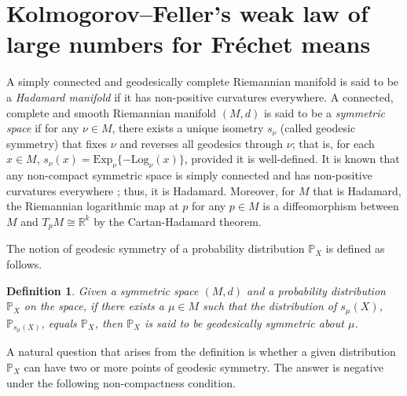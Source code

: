 \documentclass[preprint]{imsart}
\theoremstyle{plain}
\newtheorem{definition}{Definition}
\theoremstyle{remark}
\begin{document}
\section{Kolmogorov--Feller's weak law of large numbers for Fréchet means}

A simply connected and geodesically complete Riemannian manifold is said to be a {\it Hadamard manifold} if it has non-positive curvatures everywhere. A connected, complete and smooth Riemannian manifold $(M,d)$ is said to be a {\it symmetric space} if for any $\nu \in M$, there exists a unique isometry $s_\nu$ (called geodesic symmetry) that fixes $\nu$ and reverses all geodesics through $\nu$; that is, for each $x \in M$, $s_{\nu}(x)=\mbox{Exp}_{\nu}\{-\mbox{Log}_{\nu}(x)\}$, provided it is well-defined. It is known that any non-compact symmetric space is simply connected and has non-positive curvatures everywhere \citep[][]{helgason1979differential}; thus, it is Hadamard. 
% 
Moreover, for $M$ that is Hadamard, the Riemannian logarithmic map at $p$ for any $p \in M$ is a diffeomorphism between $M$ and $T_{p}M \cong \mathbb{R}^{k}$ by the Cartan-Hadamard theorem. 
 


 
The notion of geodesic symmetry of a probability distribution $\mathbb{P}_{X}$ is defined as follows.
\begin{definition}
Given a symmetric space $(M,d)$ and a probability distribution $\mathbb{P}_{X}$ on the space, if there exists a $\mu \in M$ such that the distribution of $s_\mu(X)$, $\mathbb{P}_{s_\mu (X)}$, equals $\mathbb{P}_X$, then $\mathbb{P}_{X}$ is said to be geodesically symmetric about $\mu$. %
\end{definition}
A natural question that arises from the definition is whether a given distribution $\mathbb{P}_{X}$ can have two or more points of geodesic symmetry. The answer is negative under the following non-compactness condition.


\end{document}
